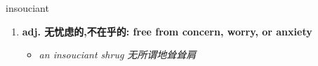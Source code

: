 
\begin{frame}
{\huge insouciant}
\begin{center}
\begin{enumerate}\Large
  \item \textbf{adj. 无忧虑的,不在乎的: free from concern, worry, or anxiety}
  \begin{itemize}
    \item \em{\Large{an insouciant shrug 无所谓地耸耸肩}}
  \end{itemize}
\end{enumerate}
\end{center}
\end{frame}
